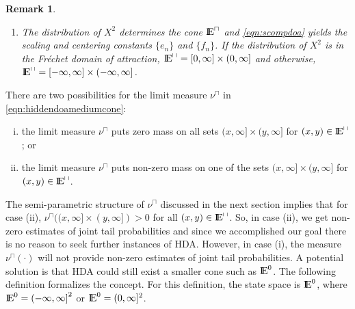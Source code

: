 \documentclass[11 pt]{amsart}
\newtheorem{rem}[thm]{Remark}
\numberwithin{equation}{section}
\begin{document}
{{\begin{rem}
{{\begin{enumerate}
\item \label{rem2:hiddendoamediumcone} {T}he distribution of $X^2$ {determines} the cone
  ${\mathop{\rm I\kern -0.20em E}\nolimits}^{\sqcap}$ and \eqref{eqn:scompdoa} yields the scaling and centering constants $\{e_n\}$ and
  $\{f_n \}$. If the distribution of $X^2$ is in the Fr\'{e}chet
  domain of attraction,
  ${\mathop{\rm I\kern -0.20em E}\nolimits}^{\sqcap} = [0, \infty] \times (0, \infty]$ and otherwise, 
  ${\mathop{\rm I\kern -0.20em E}\nolimits}^{\sqcap} = [-\infty, \infty] \times (-\infty, \infty]$. 
\end{enumerate}
}}
\end{rem}

{There are two possibilities for the limit measure}
$\nu^{\sqcap}$ in \eqref{eqn:hiddendoamediumcone}:

\begin{enumerate}[(i)]
\item the limit measure $\nu^{\sqcap}$ puts zero mass on all sets $(x,
  \infty] \times (y, \infty]$ for $(x, y) \in {\mathop{\rm I\kern -0.20em E}\nolimits}^{\sqcap}$; or 
\item the limit measure $\nu^{\sqcap}$ puts non-zero mass on one of the sets  $(x, \infty] \times (y, \infty]$ for $(x, y) \in {\mathop{\rm I\kern -0.20em E}\nolimits}^{\sqcap}$. 
\end{enumerate}

{T}he semi-parametric structure of $\nu^{\sqcap}$ {discussed}
in the next section {implies}
 that for  case (ii), $\nu^{\sqcap}((x, \infty] \times (y,
\infty]) > 0$ for all $(x, y) \in {\mathop{\rm I\kern -0.20em E}\nolimits}^{\sqcap}$. So, in case (ii), we  get non-zero estimates of
joint tail probabilities and since we accomplished our goal there is
no reason to seek further instances of HDA.
However, in case (i), the measure $\nu^\sqcap (\cdot)$ will not
provide non-zero estimates of joint tail probabilities. A potential
solution is that HDA could still exist a smaller cone such as ${\mathop{\rm I\kern -0.20em E}\nolimits}^0$. The
following definition formalizes the concept. {For this definition, the
state space is ${\mathop{\rm I\kern -0.20em E}\nolimits}^0$,
 where ${\mathop{\rm I\kern -0.20em E}\nolimits}^0 = {(-\infty, \infty]}^2$ or ${\mathop{\rm I\kern -0.20em E}\nolimits}^0 = (0, \infty]^2$.}

}}
\end{document}
